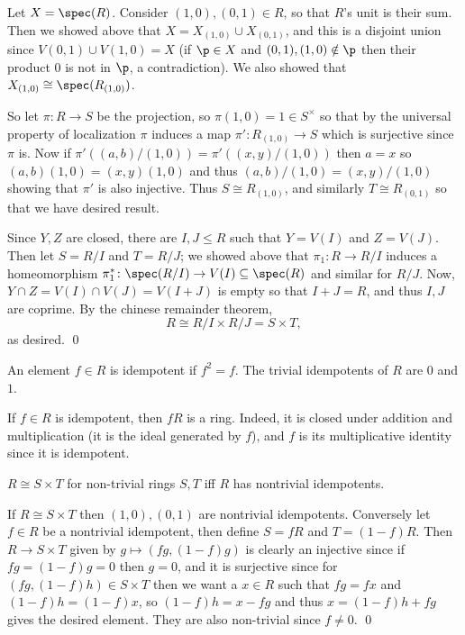 \eprop

\bproof

    Let $X=\spec(R)$.
    Consider $(1,0),(0,1)\in R$, so that $R$'s unit is their sum.
    Then we showed above that $X=X_{(1,0)}\cup X_{(0,1)}$, and this is a disjoint union since $V(0,1)\cup V(1,0)=X$ (if $\p\in X$ and $(0,1),(1,0)\notin\p$ then their product $0$ is not in
    $\p$, a contradiction).
    We also showed that $X_{(1,0)}\cong\spec(R_{(1,0)})$.

    So let $\pi\colon R\to S$ be the projection, so $\pi(1,0)=1\in S^\times$ so that by the universal property of localization $\pi$ induces a map $\pi'\colon R_{(1,0)}\to S$ which is
    surjective since $\pi$ is.
    Now if $\pi'((a,b)/(1,0))=\pi'((x,y)/(1,0))$ then $a=x$ so $(a,b)(1,0)=(x,y)(1,0)$ and thus $(a,b)/(1,0)=(x,y)/(1,0)$ showing that $\pi'$ is also injective.
    Thus $S\cong R_{(1,0)}$, and similarly $T\cong R_{(0,1)}$ so that we have desired result.

    Since $Y,Z$ are closed, there are $I,J\leq R$ such that $Y=V(I)$ and $Z=V(J)$.
    Then let $S=R/I$ and $T=R/J$; we showed above that $\pi_1\colon R\to R/I$ induces a homeomorphism $\pi_1^*\colon\spec(R/I)\to V(I)\subseteq\spec(R)$ and similar for $R/J$.
    Now, $Y\cap Z=V(I)\cap V(J)=V(I+J)$ is empty so that $I+J=R$, and thus $I,J$ are coprime.
    By the chinese remainder theorem,
    $$ R \cong R/I \times R/J = S\times T, $$
    as desired.
    \qed

\eproof

\bdefn

    An element $f\in R$ is {\emphcolor idempotent} if $f^2=f$.
    The {\emphcolor trivial idempotents} of $R$ are $0$ and $1$.

\edefn

If $f\in R$ is idempotent, then $fR$ is a ring.
Indeed, it is closed under addition and multiplication (it is the ideal generated by $f$), and $f$ is its multiplicative identity since it is idempotent.

\bprop

    $R\cong S\times T$ for non-trivial rings $S,T$ iff $R$ has nontrivial idempotents.

\eprop

\bproof

    If $R\cong S\times T$ then $(1,0),(0,1)$ are nontrivial idempotents.
    Conversely let $f\in R$ be a nontrivial idempotent, then define $S=fR$ and $T=(1-f)R$.
    Then $R\to S\times T$ given by $g\mapsto(fg,(1-f)g)$ is clearly an injective since if $fg=(1-f)g=0$ then $g=0$, and it is surjective since for $(fg,(1-f)h)\in S\times T$ then we want a $x\in R$ such that
    $fg=fx$ and $(1-f)h=(1-f)x$, so $(1-f)h=x-fg$ and thus $x=(1-f)h+fg$ gives the desired element.
    They are also non-trivial since $f\neq0$.
    \qed

